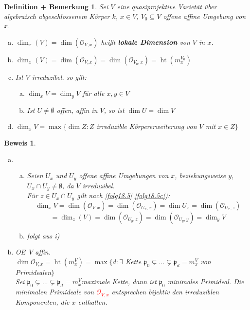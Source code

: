 \documentclass[a4paper,12pt]{report}
\theoremstyle{break}
\newtheorem{DefBem}[Def]{Definition + Bemerkung}
\theoremstyle{nonumberbreak}
\newtheorem{Bew}{Beweis}
\theoremstyle{nonumberplain}
\newcommand{\emp}[1]{\textbf{\emph{#1}}}
\newcommand{\begriff}[1]{{\index{#1}}\emp{#1}}
\DeclareMathOperator{\Ht}{ht}
\newcommand{\calO}{\mathcal{O}}
\renewcommand{\OE}{O\!\!E~}
\begin{document}
\begin{DefBem}\label{18.6}
Sei $V$ eine quasiprojektive Variet\"at \"uber algebraisch abgeschlossenem K\"orper $k$, $x\in V$, $V_0\subseteq V$ offene affine Umgebung von $x$.\begin{enumerate}[a)]
\item
	$\dim_x(V)=\dim(\calO_{V,x})$ hei\ss t \begriff{lokale Dimension} von $V$ in $x$.
\item
	$\dim_x(V)=\dim(\calO_{V,x})=\dim(\calO_{V_0,x})=\Ht(m_x^{V_0})$
\item
	Ist $V$ irreduzibel, so gilt:\begin{enumerate}[a)]
	\item[i)]
		$\dim_xV=\dim_yV$ f\"ur alle $x,y\in V$
	\item[ii)]
		Ist $U\ne\emptyset$ offen, affin in $V$, so ist $\dim U=\dim V$
	\end{enumerate}
\item
	$\dim_xV=\max\{\dim Z: Z$ irreduzible K\"orpererweiterung von $V$ mit $x\in Z\}$
\end{enumerate}\end{DefBem}

\begin{Bew}\begin{enumerate}[a)]
\item[c)]\begin{enumerate}[a)]
	\item[i)]
		Seien $U_x$ und $U_y$ offene affine Umgebungen von $x$, beziehungsweise $y$, $U_x\cap U_y\ne\emptyset$, da $V$ irreduzibel.\\
		F\"ur $z\in U_x\cap U_y$ gilt nach \ref{folg18.5} \ref{folg18.5c}):
			\[\dim_xV=\dim(\calO_{V,x})=\dim(\calO_{U_x,x})=\dim U_x=\dim(\calO_{U_x,z})\]
			\[=\dim_z(V)=\dim(\calO_{U_y,z})=\dim(\calO_{U_y,y})=\dim_y V\]
	\item[ii)]
		folgt aus i)\end{enumerate}
\item[d)]
	\OE $V$ affin.\\
	$\dim\calO_{V,x}=\Ht(m_x^V)=\max\{d:\exists$ Kette $\mathfrak p_0 \subsetneq\ldots \subsetneq\mathfrak p_d=m_x^V$ von Primidealen$\}$\\
	Sei $\mathfrak p_0 \subsetneq\ldots \subsetneq\mathfrak p_d=m_x^V$maximale Kette, dann ist $\mathfrak p_0$ minimales Primideal. Die minimalen Primideale von \textcolor{red}{$\calO_{V,x}$} entsprechen bijektiv den irreduziblen Komponenten, die $x$ enthalten.
\end{enumerate}\end{Bew}
\end{document}
